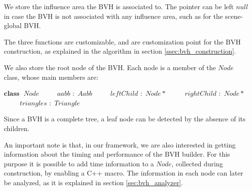 \documentclass{PoliMi_MasterThesis}
\newcommand*\Class[1]{\State $\textbf{class} \;$ #1}
\newcommand*\Member[2]{\State $\qquad$ #1 $:$ #2}
\begin{document}
We store the influence area the BVH is associated to. The pointer can be left $null$ in case the BVH is not associated with any influence area, such as for the scene-global BVH.

The three functions are customizable, and are customization point for the BVH construction, as explained in the algorithm in section \ref{ssec:bvh_construction}.

We also store the root node of the BVH. Each node is a member of the $Node$ class, whose main members are:
\begin{algorithm}[H]
	\begin{algorithmic}
		\Class{$Node$}
		\Member{$aabb$}{$Aabb$}
		\Member{$leftChild$}{$Node*$}
		\Member{$rightChild$}{$Node*$}
		\Member{$triangles$}{$Triangle$}
	\end{algorithmic}
\end{algorithm} 

Since a BVH is a complete tree, a leaf node can be detected by the absence of its children.

An important note is that, in our framework, we are also interested in getting information about the timing and performance of the BVH builder. For this purpose it is possible to add time information to a $Node$, collected during construction, by enabling a C++ macro. The information in each node can later be analyzed, as it is explained in section \ref{sec:bvh_analyzer}.
\end{document}
